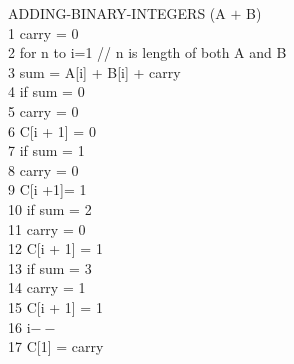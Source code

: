 \documentclass[12pt]{article}
\newcommand\tab[1][1cm]{\hspace*{#1}}
\begin{document}
\begin{enumerate}
	ADDING-BINARY-INTEGERS (A $+$ B)\\
	1   \tab carry = 0 \\
	2   \tab for n to i=1 // n is length of both A and B \\
	3   \tab \tab sum = A[i] + B[i] + carry \\
	4   \tab \tab if sum = 0 \\
	5   \tab \tab\tab carry = 0 \\
	6   \tab \tab \tab C[i + 1] = 0 \\
	7   \tab \tab if sum = 1 \\
	8   \tab \tab \tab carry = 0 \\
	9   \tab \tab \tab C[i +1]= 1 \\
	10 \tab \tab if sum = 2 \\
	11 \tab \tab \tab carry = 0 \\
	12 \tab \tab \tab C[i + 1] = 1 \\
	13 \tab \tab if sum = 3 \\
	14 \tab \tab \tab carry = 1 \\
	15 \tab \tab \tab C[i + 1] = 1 \\
	16 \tab \tab i$--$ \\
	17 \tab C[1] = carry \\
	
    
\end{enumerate}
    
\end{document}
